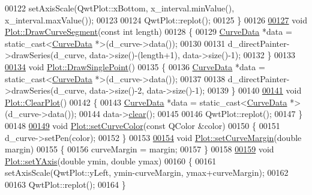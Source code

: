 \begin{DoxyCode}
00122     setAxisScale(QwtPlot::xBottom, x\_interval.minValue(), x\_interval.maxValue());
00123 
00124     QwtPlot::replot();
00125 \}
00126 
\hypertarget{plot_8cpp_source.tex_l00127}{}\hyperlink{classPlot_a19036300cad7a088f1453ff17162490f}{00127} \textcolor{keywordtype}{void} \hyperlink{classPlot_a19036300cad7a088f1453ff17162490f}{Plot::DrawCurveSegment}(\textcolor{keyword}{const} \textcolor{keywordtype}{int} length)
00128 \{
00129     \hyperlink{classCurveData}{CurveData} *data = \textcolor{keyword}{static\_cast<}\hyperlink{classCurveData}{CurveData} *\textcolor{keyword}{>}(d\_curve->data());
00130 
00131     d\_directPainter->drawSeries(d\_curve, data->size()-(length+1), data->size()-1);
00132 \}
00133 
\hypertarget{plot_8cpp_source.tex_l00134}{}\hyperlink{classPlot_acb0268b78902a0105c27e456e272e9b0}{00134} \textcolor{keywordtype}{void} \hyperlink{classPlot_acb0268b78902a0105c27e456e272e9b0}{Plot::DrawSinglePoint}()
00135 \{
00136     \hyperlink{classCurveData}{CurveData} *data = \textcolor{keyword}{static\_cast<}\hyperlink{classCurveData}{CurveData} *\textcolor{keyword}{>}(d\_curve->data());
00137 
00138     d\_directPainter->drawSeries(d\_curve, data->size()-2, data->size()-1);
00139 \}
00140 
\hypertarget{plot_8cpp_source.tex_l00141}{}\hyperlink{classPlot_af2b50b6923556e2bb04fd0b0dc7da318}{00141} \textcolor{keywordtype}{void} \hyperlink{classPlot_af2b50b6923556e2bb04fd0b0dc7da318}{Plot::ClearPlot}()
00142 \{
00143     \hyperlink{classCurveData}{CurveData} *data = \textcolor{keyword}{static\_cast<}\hyperlink{classCurveData}{CurveData} *\textcolor{keyword}{>}(d\_curve->data());
00144     data->\hyperlink{classCurveData_ae898810872a274a681ab60131ecf922b}{clear}();
00145 
00146     QwtPlot::replot();
00147 \}
00148 
\hypertarget{plot_8cpp_source.tex_l00149}{}\hyperlink{classPlot_af2d2fb49ecae0a12196606a153f5bee0}{00149} \textcolor{keywordtype}{void} \hyperlink{classPlot_af2d2fb49ecae0a12196606a153f5bee0}{Plot::setCurveColor}(\textcolor{keyword}{const} QColor &color)
00150 \{
00151     d\_curve->setPen(color);
00152 \}
00153 
\hypertarget{plot_8cpp_source.tex_l00154}{}\hyperlink{classPlot_a06a7d71c936d5e303fddbed3aac9b99f}{00154} \textcolor{keywordtype}{void} \hyperlink{classPlot_a06a7d71c936d5e303fddbed3aac9b99f}{Plot::setCurveMargin}(\textcolor{keywordtype}{double} margin)
00155 \{
00156     curveMargin = margin;
00157 \}
00158 
\hypertarget{plot_8cpp_source.tex_l00159}{}\hyperlink{classPlot_a783f800388cb6615b60efbafa523fbf0}{00159} \textcolor{keywordtype}{void} \hyperlink{classPlot_a783f800388cb6615b60efbafa523fbf0}{Plot::setYAxis}(\textcolor{keywordtype}{double} ymin, \textcolor{keywordtype}{double} ymax)
00160 \{
00161     setAxisScale(QwtPlot::yLeft, ymin-curveMargin, ymax+curveMargin);
00162 
00163     QwtPlot::replot();
00164 \}
\end{DoxyCode}
